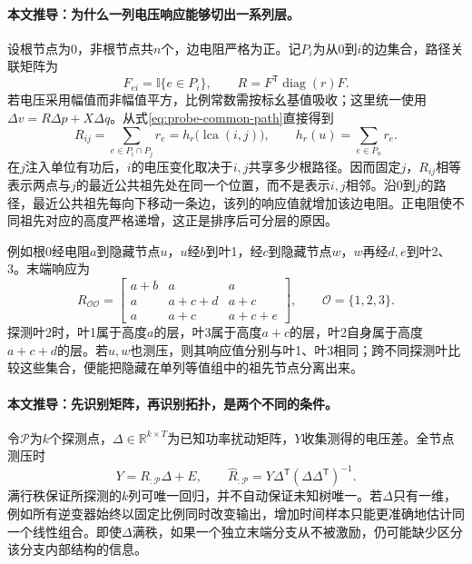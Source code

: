 \paragraph{本文推导：为什么一列电压响应能够切出一系列层。}
设根节点为0，非根节点共$n$个，边电阻严格为正。记$P_i$为从0到$i$的边集合，路径关联矩阵为
\begin{equation}
 F_{ei}=\mathbb{I}\{e\in P_i\},\qquad
 R=F^{\mathsf T}\operatorname{diag}(r)F.
 \label{eq:probe-common-path}
\end{equation}
若电压采用幅值而非幅值平方，比例常数需按标幺基值吸收；这里统一使用$\Delta v=R\Delta p+X\Delta q$。从式\eqref{eq:probe-common-path}直接得到
\begin{equation}
 R_{ij}=\sum_{e\in P_i\cap P_j}r_e
       =h_r\bigl(\operatorname{lca}(i,j)\bigr),
 \qquad h_r(u)=\sum_{e\in P_u}r_e.
 \label{eq:probe-lca}
\end{equation}
在$j$注入单位有功后，$i$的电压变化取决于$i,j$共享多少根路径。因而固定$j$，$R_{ij}$相等表示两点与$j$的最近公共祖先处在同一个位置，而不是表示$i,j$相邻。沿$0$到$j$的路径，最近公共祖先每向下移动一条边，该列的响应值就增加该边电阻。正电阻使不同祖先对应的高度严格递增，这正是排序后可分层的原因。

例如根0经电阻$a$到隐藏节点$u$，$u$经$b$到叶1，经$c$到隐藏节点$w$，$w$再经$d,e$到叶2、3。末端响应为
\begin{equation}
 R_{\mathcal O\mathcal O}=
 \begin{bmatrix}
 a+b&a&a\\
 a&a+c+d&a+c\\
 a&a+c&a+c+e
 \end{bmatrix},\qquad \mathcal O=\{1,2,3\}.
 \label{eq:probe-three-leaf}
\end{equation}
探测叶2时，叶1属于高度$a$的层，叶3属于高度$a+c$的层，叶2自身属于高度$a+c+d$的层。若$u,w$也测压，则其响应值分别与叶1、叶3相同；跨不同探测叶比较这些集合，便能把隐藏在单列等值组中的祖先节点分离出来。

\paragraph{本文推导：先识别矩阵，再识别拓扑，是两个不同的条件。}
令$\mathcal P$为$k$个探测点，$\Delta\in\mathbb R^{k\times T}$为已知功率扰动矩阵，$Y$收集测得的电压差。全节点测压时
\begin{equation}
 Y=R_{:\mathcal P}\Delta+E,
 \qquad
 \widehat R_{:\mathcal P}
 =Y\Delta^{\mathsf T}(\Delta\Delta^{\mathsf T})^{-1}.
 \label{eq:probe-ls}
\end{equation}
满行秩保证所探测的$k$列可唯一回归，并不自动保证未知树唯一。若$\Delta$只有一维，例如所有逆变器始终以固定比例同时改变输出，增加时间样本只能更准确地估计同一个线性组合。即使$\Delta$满秩，如果一个独立末端分支从不被激励，仍可能缺少区分该分支内部结构的信息。

